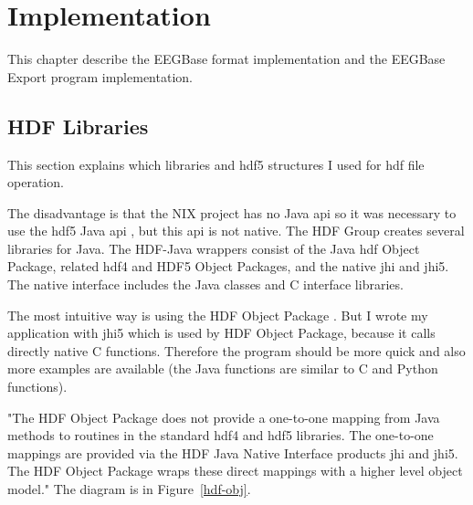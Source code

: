\chapter{Implementation}
This chapter describe the EEGBase format implementation and the EEGBase Export program implementation. 

\section{HDF Libraries}
\label{hdflib}
This section explains which libraries and \gls{hdf5} structures I used for \gls{hdf} file operation. 

The disadvantage is that the NIX project has no Java \gls{api} so it was necessary to use the \gls{hdf5} Java \gls{api} \cite{hdfjava}, but this \gls{api} is not native. The HDF Group creates several libraries for Java. The HDF-Java wrappers consist of the Java \gls{hdf} Object Package, related \gls{hdf4} and HDF5 Object Packages, and the native \gls{jhi} and \gls{jhi5}. The native interface includes the Java classes and C interface libraries.

The most intuitive way is using the HDF Object Package \cite{hdf_object}. But I wrote my application with \gls{jhi5} which is used by HDF Object Package, because it calls directly native C functions. Therefore the program should be more quick and also more examples are available (the Java functions are similar to C and Python functions). 

"The HDF Object Package does not provide a one-to-one mapping from Java methods to routines in the standard \gls{hdf4} and \gls{hdf5} libraries. The one-to-one mappings are provided via the HDF Java Native Interface products \gls{jhi} and \gls{jhi5}. The HDF Object Package wraps these direct mappings with a higher level object model." \cite{hdf_object} The diagram is in Figure~\ref{hdf-obj}.

